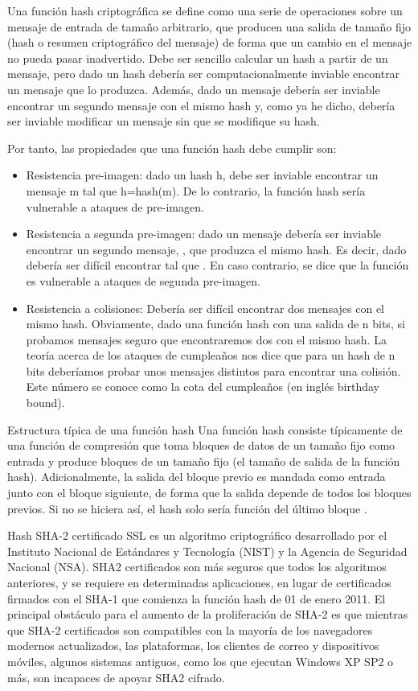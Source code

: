 \documentclass[spanish]{article}
\begin{document}
Una función hash criptográfica se define como una serie de operaciones sobre un mensaje de entrada de tamaño arbitrario, que producen una salida de tamaño fijo (hash o resumen criptográfico del mensaje) de forma que un cambio en el mensaje no pueda pasar inadvertido. Debe ser sencillo calcular un hash a partir de un mensaje, pero dado un hash debería ser computacionalmente inviable encontrar un mensaje que lo produzca. Además, dado un mensaje debería ser inviable encontrar un segundo mensaje con el mismo hash y, como ya he dicho, debería ser inviable modificar un mensaje sin que se modifique su hash.

Por tanto, las propiedades que una función hash debe cumplir son:
\begin{itemize}
\item Resistencia pre-imagen: dado un hash h, debe ser inviable encontrar un mensaje m tal que h=hash(m). De lo contrario, la función hash sería vulnerable a ataques de pre-imagen.
\item Resistencia a segunda pre-imagen: dado un mensaje  debería ser inviable encontrar un segundo mensaje, , que produzca el mismo hash. Es decir, dado  debería ser difícil encontrar  tal que . En caso contrario, se dice que la función es vulnerable a ataques de segunda pre-imagen.
\item Resistencia a colisiones: Debería ser difícil encontrar dos mensajes con el mismo hash. Obviamente, dado una función hash con una salida de n bits, si probamos   mensajes seguro que encontraremos dos con el mismo hash. La teoría acerca de los ataques de cumpleaños nos dice que para un hash de n bits deberíamos probar unos  mensajes distintos para encontrar una colisión. Este número se conoce como la cota del cumpleaños (en inglés birthday bound).
\end{itemize}

Estructura típica de una función hash
Una función hash consiste típicamente de una función de compresión que toma bloques de datos de un tamaño fijo como entrada y produce bloques de un tamaño fijo (el tamaño de salida de la función hash). Adicionalmente, la salida del bloque previo es mandada como entrada junto con el bloque siguiente, de forma que la salida depende de todos los bloques previos. Si no se hiciera así, el hash solo sería función del último bloque  .


Hash SHA-2 certificado SSL es un algoritmo criptográfico desarrollado por el Instituto Nacional de Estándares y Tecnología (NIST) y la Agencia de Seguridad Nacional (NSA). SHA2 certificados son más seguros que todos los algoritmos anteriores, y se requiere en determinadas aplicaciones, en lugar de certificados firmados con el SHA-1 que comienza la función hash de 01 de enero 2011.
El principal obstáculo para el aumento de la proliferación de SHA-2 es que mientras que SHA-2 certificados son compatibles con la mayoría de los navegadores modernos actualizados, las plataformas, los clientes de correo y dispositivos móviles, algunos sistemas antiguos, como los que ejecutan Windows XP SP2 o más, son incapaces de apoyar SHA2 cifrado.
\end{document}
